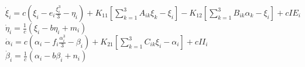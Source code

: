 \documentclass[12pt]{article}
\begin{document}
   
    $\displaystyle \dot{\xi}_i = c\left(\xi_i-e_i\frac{\xi_i^3}{3}-\eta_i\right) + K_{11}\left[\sum_{k=1}^{3} A_{ik}\xi_k-\xi_i\right] - K_{12}\left[\sum_{k=1}^{3} B_{ik}\alpha_k-\xi_i\right] + cIE_i$
    \\
    $\displaystyle \dot{\eta}_i = \frac{1}{c}\left(\xi_i-b\eta_i+m_i\right)$
    \\
    $\displaystyle \dot{\alpha}_i = c\left(\alpha_i-f_i\frac{\alpha_i^3}{3}-\beta_i\right) + K_{21}\left[\sum_{k=1}^{3} C_{ik}\xi_i-\alpha_i\right] + cII_i$
    \\
    $\displaystyle \dot{\beta}_i = \frac{1}{c}\left(\alpha_i-b\beta_i+n_i\right)$

    
  
\end{document}

